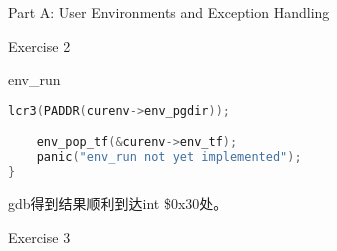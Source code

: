 \documentclass[GBK,winfonts,a4paper,10pt]{ctexart}
\begin{document}
\begin{section}{ Part A: User Environments and Exception Handling }
\begin{subsection}{ Exercise 2 }
\begin{subsubsection}{env\_run}
\begin{lstlisting}[language=C]
    lcr3(PADDR(curenv->env_pgdir));

    env_pop_tf(&curenv->env_tf);    
	panic("env_run not yet implemented");
}
\end{lstlisting}
\end{subsubsection}

\par
gdb得到结果顺利到达int \$0x30处。
\end{subsection}

\begin{subsection}{ Exercise 3 }
\end{subsection}


\end{section}
\end{document}
